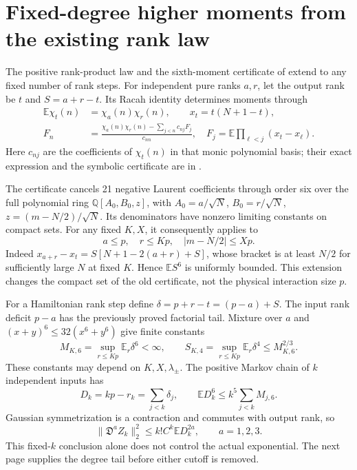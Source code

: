 \documentclass[11pt]{article}
\newcommand{\EE}{\mathbb E}
\newcommand{\DD}{\mathfrak D}
\begin{document}
\newpage
\section{Fixed-degree higher moments from the existing rank law}
The positive rank-product law and the sixth-moment certificate of
\cite{Central,Rank} extend to any fixed number of rank steps.
For independent pure ranks $a,r$, let the output rank be $t$ and
$S=a+r-t$. Its Racah identity determines moments through
\begin{align}
 \EE\chi_t(n)&=\chi_a(n)\chi_r(n),\qquad x_t=t(N+1-t),\\
 F_n&=\frac{\chi_a(n)\chi_r(n)-\sum_{j<n}c_{nj}F_j}{c_{nn}},
 \quad F_j=\EE\prod_{\ell<j}(x_t-x_\ell).
\end{align}
Here $c_{nj}$ are the coefficients of $\chi_t(n)$ in that monic
polynomial basis; their exact expression and the symbolic certificate
are in \cite{Central}.

The certificate cancels 21 negative Laurent coefficients through
order six over the full polynomial ring $\mathbb Q[A_0,B_0,z]$, with
$A_0=a/\sqrt N$, $B_0=r/\sqrt N$, $z=(m-N/2)/\sqrt N$.
Its denominators have nonzero limiting constants on compact sets.
For any fixed $K,X$, it consequently applies to
\begin{equation}
 a\le p,\quad r\le Kp,\quad |m-N/2|\le Xp.
\end{equation}
Indeed $x_{a+r}-x_t=S[N+1-2(a+r)+S]$, whose bracket is at least
$N/2$ for sufficiently large $N$ at fixed $K$. Hence $\EE S^6$ is
uniformly bounded. This extension changes the compact set of the
old certificate, not the physical interaction size $p$.

For a Hamiltonian rank step define $\delta=p+r-t=(p-a)+S$.
The input rank deficit $p-a$ has the previously proved factorial tail.
Mixture over $a$ and $(x+y)^6\le32(x^6+y^6)$ give finite constants
\begin{equation}
 M_{K,6}=\sup_{r\le Kp}\EE_r\delta^6<\infty,\qquad
 S_{K,4}=\sup_{r\le Kp}\EE_r\delta^4\le M_{K,6}^{2/3}.\label{eq:step6}
\end{equation}
These constants may depend on $K,X,\lambda_\pm$.
The positive Markov chain of $k$ independent inputs has
\begin{equation}
 D_k=kp-r_k=\sum_{j<k}\delta_j,\qquad
 \EE D_k^6\le k^5\sum_{j<k}M_{j,6}.\label{eq:fixed6}
\end{equation}
Gaussian symmetrization is a contraction and commutes with output
rank, so
\begin{equation}
 \|\DD^aZ_k\|_2^2\le k!C^k\EE D_k^{2a},\qquad a=1,2,3.
\end{equation}
This fixed-$k$ conclusion alone does not control the actual exponential.
The next page supplies the degree tail before either cutoff is removed.
\end{document}
